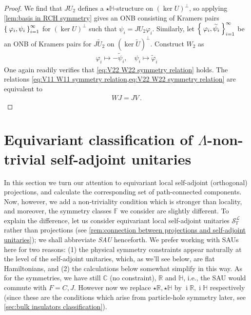 \documentclass[a4paper,10pt]{article}
\numberwithin{equation}{section}
\theoremstyle{plain}
\theoremstyle{plain}
\theoremstyle{plain}
\theoremstyle{plain}
\theoremstyle{plain}
\theoremstyle{remark}
\theoremstyle{definition}
\theoremstyle{plain}
\newcommand{\ii}{\operatorname{i}}
\newcommand{\RR}{\mathbb{R}}
\newcommand{\CC}{\mathbb{C}}
\newcommand{\FF}{\mathbb{F}}
\newcommand{\calSU}{\mathcal{S}}
\newcommand{\calL}{\mathcal{L}}
\newcommand{\ti}[1]{\widetilde{#1}}
\newcommand{\vf}{\varphi}
\newcommand{\HH}{\mathbb{H}}
\newcommand{\eq}[1]{\begin{align*}#1\end{align*}}
\newcommand{\eql}[1]{\begin{align}#1\end{align}}
\begin{document}
\begin{proof}
		We find that $JU_{2}$ defines a $\star\HH$-structure on $(\ker U)^\perp$, so applying \cref{lem:basis in RCH symmetry} gives an ONB consisting of Kramers pairs $\Set{\vf_i,\psi_i}_{i=1}^\infty$ for $(\ker U)^\perp$ such that $\psi_i=JU_{2}\vf_i$. Similarly, let $\Set{\vf_i,\ti{\psi}_i}_{i=1}^\infty$ be an ONB of Kramers pairs for $J\ti{U}_2$ on $(\ker \ti{U})^\perp$. Construct $W_{2}$ as \eql{\vf_i\mapsto -\ti{\psi}_i,\quad \psi_i\mapsto \ti{\vf}_i } One again readily verifies that \cref{eq:V22 W22 symmetry relation} holds. The relations \cref{eq:V11 W11 symmetry relation,eq:V22 W22 symmetry relation} are equivalent to \eq{WJ=JV\,.}
	\end{proof}
	
	\section{Equivariant classification of $\Lambda$-non-trivial self-adjoint unitaries}\label{sec:local SA unitaries classification}
	
	
	In this section we turn our attention to equivariant local self-adjoint (orthogonal) projections, and calculate the corresponding set of path-connected components. Now, however, we add a non-triviality condition which is stronger than locality, and moreover, the symmetry classes $\FF$ we consider are slightly different. To explain the difference, let us consider equivariant local self-adjoint unitaries $\calSU^{\calL}_{\FF}$ rather than projections (see \cref{rem:connection between projections and self-adjoint unitaries}); we shall abbreviate \emph{SAU} henceforth. We prefer working with SAUs here for two reasons: (1) the physical symmetry constraints appear naturally at the level of the self-adjoint unitaries, which, as we'll see below, are flat Hamiltonians, and (2) the calculations below somewhat simplify in this way. As for the symmetries, we have still $\CC$ (no constraint), $\RR$ and $\HH$, i.e., the SAU would commute with $F=C,J$. However now we replace $\star\RR,\star\HH$ by $\ii \RR,\ii\HH$ respectively (since these are the conditions which arise from particle-hole symmetry later, see \cref{sec:bulk insulators classification}).
	
\end{document}
